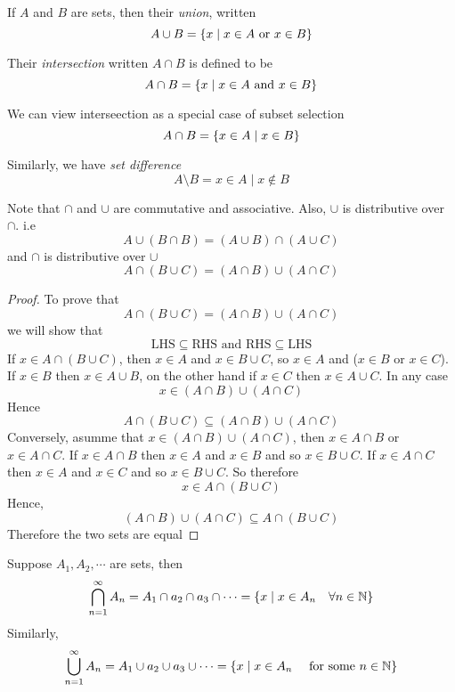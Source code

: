 \documentclass{article}
\begin{document}
\begin{defi}[Union]
    If $A$ and $B$ are sets, then their \emph{union}, written
    \[
        A \cup B = \left\{ x \mid x \in A \text{ or } x \in B \right\}
    \]
\end{defi}

\begin{defi}[Intersection]
    Their \emph{intersection} written $A \cap B$ is defined to be
    \[
        A \cap B = \left\{ x \mid x \in A \text{ and } x \in B \right\}  
    \]
\end{defi}
\begin{remark}
    We can view interseection as a special case of subset selection
    \[
        A \cap B = \left\{ x \in A \mid x \in B \right\}  
    \]
\end{remark}

\begin{defi}
    Similarly, we have \emph{set difference}
    \[
        A \setminus B = {x \in A \mid x \notin B}  
    \]
\end{defi}

Note that $\cap$ and $\cup$ are commutative and associative.
Also, $\cup$ is distributive over $\cap$. i.e
\[
    A \cup (B \cap B) = (A \cup B) \cap (A \cup C)
\]
and $\cap$ is distributive over $\cup$
\[
    A \cap (B \cup C) = (A \cap B) \cup (A \cap C)
\]
\begin{proof}
    To prove that
    \[
        A \cap (B \cup C) = (A \cap B) \cup (A \cap C)
    \]
    we will show that 
    \[
        \text{LHS} \subseteq \text{RHS} \text{ and } \text{RHS} \subseteq \text{LHS}
    \]
    If $x \in A \cap (B \cup C)$, then $x \in A$ and $x \in B \cup C$, 
    so $x \in A$ and ($x \in B$ or $x \in C$). 
    If $x \in B$ then $x \in A \cup B$,
    on the other hand if $x \in C$ then $x \in A \cup C$.
    In any case 
    \[
        x \in (A \cap B) \cup (A \cap C)
    \]
    Hence
    \[
        A \cap (B \cup C) \subseteq (A \cap B) \cup (A \cap C)  
    \]
    Conversely, asumme that $x \in (A \cap B) \cup (A \cap C)$, 
    then $x \in A \cap B$ or $x \in A \cap C$.
    If $x \in A \cap B$ then $x \in A$ and $x \in B$ and so $x \in B \cup C$.
    If $x \in A \cap C$ then $x \in A$ and $x \in C$ and so $x \in B \cup C$.
    So therefore
    \[
        x \in A \cap (B \cup C)
    \]
    Hence,
    \[
        (A \cap B) \cup (A \cap C) \subseteq A \cap (B \cup C) 
    \]
    Therefore the two sets are equal
\end{proof}

Suppose $A_1, A_2, \cdots$ are sets, then
\[
    \bigcap_{n=1}^\infty A_n = A_1 \cap a_2 \cap a_3 \cap \cdots = \left\{ x \mid x \in A_n \quad \forall n \in \mathbb{N} \right\}
\]
Similarly, 
\[
    \bigcup_{n=1}^\infty A_n = A_1 \cup a_2 \cup a_3 \cup \cdots = \left\{ x \mid x \in A_n \quad \text{ for some } n \in \mathbb{N} \right\}
\]
\end{document}
